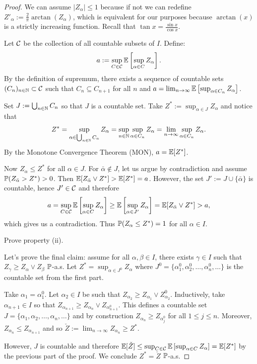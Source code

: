 \begin{proof}
    We can assume $|Z_\alpha| \leq 1$ because if not we can redefine $Z'_\alpha := \frac{2}{\pi} \arctan(Z_\alpha)$, which is equivalent for our purposes because $\arctan(x)$ is a strictly increasing function. Recall that $\tan x = \frac{\sin x}{\cos x}$.
    
    Let $\mathcal{C}$ be the collection of all countable subsets of $I$. Define:
    \[ a := \sup_{C \in \mathcal{C}} \mathbb E \left[ \sup_{\alpha \in C} Z_\alpha \right]. \]
    By the definition of supremum, there exists a sequence of countable sets $(C_n)_{n \in \mathbb N} \subset \mathcal{C}$ such that $C_n \subseteq C_{n+1}$ for all $n$ and $a = \lim_{n \to \infty} \mathbb E \left[ \sup_{\alpha \in C_n} Z_\alpha \right]$.
    
    Set $J := \bigcup_{n \in \mathbb N} C_n$ so that $J$ is a countable set. Take $Z^* := \sup_{\alpha \in J} Z_\alpha$ and notice that
    \[ Z^* = \sup_{\alpha \in \bigcup_{n \in \mathbb N} C_n} Z_\alpha = \sup_{n \in \mathbb N} \sup_{\alpha \in C_n} Z_\alpha = \lim_{n \to \infty} \sup_{\alpha \in C_n} Z_\alpha. \]
    By the Monotone Convergence Theorem (MON), $a = \mathbb E[Z^*]$.
    
    Now $Z_\alpha \leq Z^*$ for all $\alpha \in J$. For $\bar{\alpha} \notin J$, let us argue by contradiction and assume $\mathbb P(Z_{\bar{\alpha}} > Z^*) > 0$. Then $\mathbb E[Z_{\bar{\alpha}} \vee Z^*] > \mathbb E[Z^*] = a$.
    However, the set $J' := J \cup \{\bar{\alpha}\}$ is countable, hence $J' \in \mathcal{C}$ and therefore
    \[ a = \sup_{C \in \mathcal{C}} \mathbb E \left[ \sup_{\alpha \in C} Z_\alpha \right] \geq \mathbb E \left[ \sup_{\alpha \in J'} Z_\alpha \right] = \mathbb E[Z_{\bar{\alpha}} \vee Z^*] > a, \]
    which gives us a contradiction. Thus $\mathbb P(Z_\alpha \leq Z^*) = 1$ for all $\alpha \in I$.
    
    \begin{homework}
        Prove property (ii).
    \end{homework}
    
    Let's prove the final claim: assume for all $\alpha, \beta \in I$, there exists $\gamma \in I$ such that $Z_\gamma \geq Z_\alpha \vee Z_\beta$ $\mathbb P$-a.s.
    Let $Z^* = \sup_{\alpha \in J^0} Z_\alpha$ where $J^0 = \{ \alpha_1^0, \alpha_2^0, \dots, \alpha_n^0, \dots \}$ is the countable set from the first part.
    
    Take $\alpha_1 = \alpha_1^0$. Let $\alpha_2 \in I$ be such that $Z_{\alpha_2} \geq Z_{\alpha_1} \vee Z_{\alpha_2}^0$.
    Inductively, take $\alpha_{n+1} \in I$ so that $Z_{\alpha_{n+1}} \geq Z_{\alpha_n} \vee Z_{\alpha_{n+1}^0}$.
    This defines a countable set $J = \{ \alpha_1, \alpha_2, \dots, \alpha_n, \dots \}$ and by construction $Z_{\alpha_n} \geq Z_{\alpha_j^0}$ for all $1 \leq j \leq n$. Moreover, $Z_{\alpha_n} \leq Z_{\alpha_{n+1}}$ and so $\check{Z} := \lim_{n \to \infty} Z_{\alpha_n} \geq Z^*$.
    
    However, $J$ is countable and therefore $\mathbb E[\check{Z}] \leq \sup_{C \in \mathcal{C}} \mathbb E \left[ \sup_{\alpha \in C} Z_\alpha \right] = \mathbb E[Z^*]$ by the previous part of the proof. We conclude $Z^* = \check{Z}$ $\mathbb P$-a.s.
\end{proof}